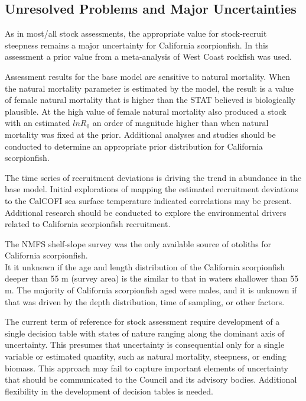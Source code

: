 \documentclass[12pt,]{article}
\begin{document}
\subsection*{Unresolved Problems and Major
Uncertainties}\label{unresolved-problems-and-major-uncertainties}

As in most/all stock assessments, the appropriate value for
stock-recruit steepness remains a major uncertainty for California
scorpionfish. In this assessment a prior value from a meta-analysis of
West Coast rockfish was used.

Assessment results for the base model are sensitive to natural
mortality. When the natural mortality parameter is estimated by the
model, the result is a value of female natural mortality that is higher
than the STAT believed is biologically plausible. At the high value of
female natural mortality also produced a stock with an estimated
\(lnR_0\) an order of magnitude higher than when natural mortality was
fixed at the prior. Additional analyses and studies should be conducted
to determine an appropriate prior distribution for California
scorpionfish.

The time series of recruitment deviations is driving the trend in
abundance in the base model. Initial explorations of mapping the
estimated recruitment deviations to the CalCOFI sea surface temperature
indicated correlations may be present. Additional research should be
conducted to explore the environmental drivers related to California
scorpionfish recruitment.

The NMFS shelf-slope survey was the only available source of otoliths
for California scorpionfish.\\
It it unknown if the age and length distribution of the California
scorpionfish deeper than 55 m (survey area) is the similar to that in
waters shallower than 55 m. The majority of California scorpionfish aged
were males, and it is unknown if that was driven by the depth
distribution, time of sampling, or other factors.

The current term of reference for stock assessment require development
of a single decision table with states of nature ranging along the
dominant axis of uncertainty. This presumes that uncertainty is
consequential only for a single variable or estimated quantity, such as
natural mortality, steepness, or ending biomass. This approach may fail
to capture important elements of uncertainty that should be communicated
to the Council and its advisory bodies. Additional flexibility in the
development of decision tables is needed.
\end{document}
